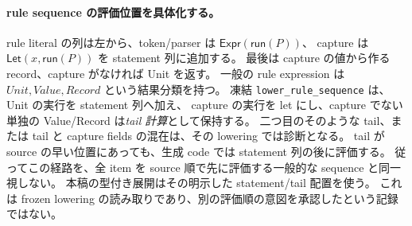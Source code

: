 \documentclass[11pt,a4paper]{article}
\begin{document}
\paragraph{rule sequence の評価位置を具体化する。}
rule literal の列は左から、token/parser は \(\mathsf{Expr}(\mathsf{run}(P))\)、
capture は \(\mathsf{Let}(x,\mathsf{run}(P))\) を statement 列に追加する。
最後は capture の値から作る record、capture がなければ Unit を返す。
一般の rule expression は \(Unit,Value,Record\) という結果分類を持つ。
凍結 \texttt{lower\_rule\_sequence} は、Unit の実行を statement 列へ加え、
capture の実行を let にし、capture でない単独の Value/Record は\emph{tail 計算}として保持する。
二つ目のそのような tail、または tail と capture fields の混在は、その lowering では診断となる。
tail が source の早い位置にあっても、生成 code では statement 列の後に評価する。
従ってこの経路を、全 item を source 順で先に評価する一般的な sequence と同一視しない。
本稿の型付き展開はその明示した statement/tail 配置を使う。
これは frozen lowering の読み取りであり、別の評価順の意図を承認したという記録ではない。
\end{document}

